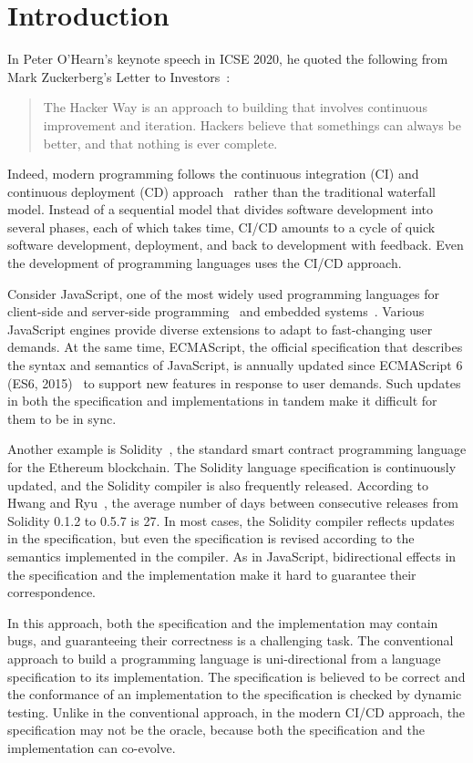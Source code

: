 \section{Introduction}\label{sec:intro}

In Peter O'Hearn's keynote speech in ICSE 2020, he quoted the following from
Mark Zuckerberg's Letter to Investors~\cite{mzletter}:
\begin{quote}
  The Hacker Way is an approach to building that involves continuous improvement
  and iteration.  Hackers believe that somethings can always be better, and that
  nothing is ever complete.
\end{quote}
Indeed, modern programming follows the continuous integration (CI) and
continuous deployment (CD) approach~\cite{cicd} rather than the traditional waterfall model.
Instead of a sequential model that divides software development into
several phases, each of which takes time, CI/CD amounts to a cycle of
quick software development, deployment, and back to development with
feedback. Even the development of programming languages uses the CI/CD approach.

Consider JavaScript, one of the most widely used programming languages
for client-side and server-side programming~\cite{nodejs} and
embedded systems~\cite{moddable,espruino,tessel2}.  Various JavaScript
engines provide diverse extensions to adapt to fast-changing user demands.  At
the same time, ECMAScript, the official specification that describes the syntax and
semantics of JavaScript, is annually updated since ECMAScript 6 (ES6,
2015)~\cite{es6} to support new features in response to user demands.
Such updates in both the specification and implementations in tandem make it
difficult for them to be in sync.

Another example is Solidity~\cite{officialSolDoc}, the standard smart contract programming language
for the Ethereum blockchain.  The Solidity language specification is continuously
updated, and the Solidity compiler is also frequently released.  According to
Hwang and Ryu~\cite{solidity-gap}, the average number of days between consecutive
releases from Solidity 0.1.2 to 0.5.7 is 27.  In most cases, the Solidity compiler reflects
updates in the specification, but even the specification is revised
according to the semantics implemented in the compiler.  As in JavaScript,
bidirectional effects in the specification and the implementation make
it hard to guarantee their correspondence.

In this approach, both the specification and the implementation may contain bugs,
and guaranteeing their correctness is a challenging task.
The conventional approach to build a programming language is uni-directional from
a language specification to its implementation.  The specification is believed to
be correct and the conformance of an implementation to the specification is
checked by dynamic testing.  Unlike in the conventional approach, in the modern CI/CD
approach, the specification may not be the oracle, because both the
specification and the implementation can co-evolve.

